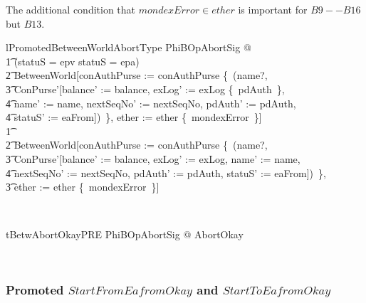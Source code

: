 The additional condition that $mondexError \in  ether$ is important for $B9--B16$ but $B13$.
%
\begin{LNewLemma}
\begin{theorem}{lPromotedBetweenWorldAbortType}
    \forall PhiBOpAbortSig @ \\
        \t1 \IF (statuS = epv \lor  statuS = epa) \THEN  \\
            \t2 BetweenWorld[conAuthPurse := conAuthPurse \oplus \{~(name?, \\
                \t3 \theta ConPurse'[balance' := balance, exLog' := exLog \cup \{~pdAuth~\}, \\
                    \t4 name' := name, nextSeqNo' := nextSeqNo, pdAuth' := pdAuth,\\
                    \t4 statuS' := eaFrom])~\}, ether := ether \cup  \{~mondexError~\}] \\
        \t1 \ELSE  \\
            \t2 BetweenWorld[conAuthPurse := conAuthPurse \oplus \{~(name?, \\
                \t3 \theta ConPurse'[balance' := balance, exLog' := exLog, name' := name, \\
                    \t4 nextSeqNo' := nextSeqNo, pdAuth' := pdAuth, statuS' := eaFrom])~\}, \\
                \t3 ether := ether \cup  \{~mondexError~\}]
\end{theorem}~\end{LNewLemma}

\begin{LNewThm}
\begin{theorem}{tBetwAbortOkayPRE}
   \forall PhiBOpAbortSig @ \pre AbortOkay
\end{theorem}~\end{LNewThm}

\subsubsection{Promoted $StartFromEafromOkay$ and $StartToEafromOkay$}

